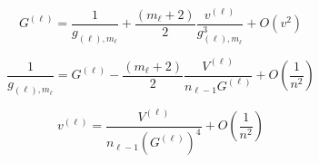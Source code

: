 \documentclass{beamer}
\def\eell{{(\ell)}}
\begin{document}
\begin{frame}
	\begin{equation*}\tag{4.101}
		G^\eell = \frac{1}{g_{\eell,m_\ell}} + \frac{(m_\ell+2)}{2}\frac{v^\eell}{g^3_{\eell,m_\ell}} + O\left(v^2\right)
	\end{equation*}

	\begin{equation*}\tag{4.102}
		\frac{1}{g_{\eell,m_\ell}} = G^\eell - \frac{(m_\ell+2)}{2}\frac{V^\eell}{n_{\ell-1}G ^\eell} + O\left(\frac{1}{n^2}\right)
	\end{equation*}

	\begin{equation*}
		v^\eell = \frac{V^\eell}{n_{\ell-1}(G^\eell)^4 } + O\left(\frac{1}{n^2}\right)  
	\end{equation*}
\end{frame}
\end{document}
